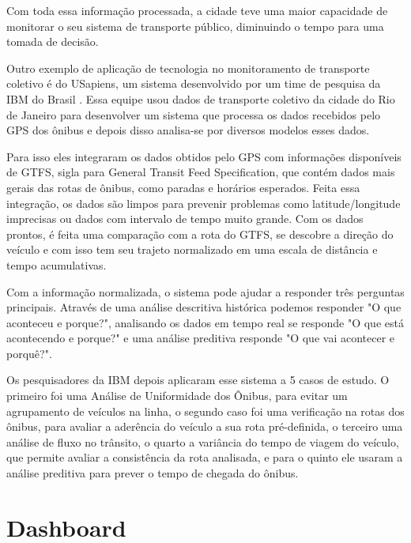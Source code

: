\par Com toda essa informação processada, a cidade teve uma maior capacidade de monitorar o seu sistema de transporte público, diminuindo o tempo para uma tomada de decisão.

\par Outro exemplo de aplicação de tecnologia no monitoramento de transporte coletivo é do USapiens, um sistema desenvolvido por um time de pesquisa da IBM do Brasil \cite{Vieira2015}. Essa equipe usou dados de transporte coletivo da cidade do Rio de Janeiro para desenvolver um sistema que processa os dados recebidos pelo GPS dos ônibus e depois disso analisa-se por diversos modelos esses dados.

\par Para isso eles integraram os dados obtidos pelo GPS com informações disponíveis de GTFS, sigla para General Transit Feed Specification, que contém dados mais gerais das rotas de ônibus, como paradas e horários esperados. Feita essa integração, os dados são limpos para prevenir problemas como latitude/longitude imprecisas ou dados com intervalo de tempo muito grande. Com os dados prontos, é feita uma comparação com a rota do GTFS, se descobre a direção do veículo e com isso tem seu trajeto normalizado em uma escala de distância e tempo acumulativas.

\par Com a informação normalizada, o sistema pode ajudar a responder três perguntas principais. Através de uma análise descritiva histórica podemos responder "O que aconteceu e porque?", analisando os dados em tempo real se responde "O que está acontecendo e porque?" e uma análise preditiva responde "O que vai acontecer e porquê?".

\par Os pesquisadores da IBM depois aplicaram esse sistema a 5 casos de estudo. O primeiro foi uma Análise de Uniformidade dos Ônibus, para evitar um agrupamento de veículos na linha, o segundo caso foi uma verificação na rotas dos ônibus, para avaliar a aderência do veículo a sua rota pré-definida, o terceiro uma análise de fluxo no trânsito, o quarto a variância do tempo de viagem do veículo, que permite avaliar a consistência da rota analisada, e para o quinto ele usaram a análise preditiva para prever o tempo de chegada do ônibus.

\section{Dashboard}

